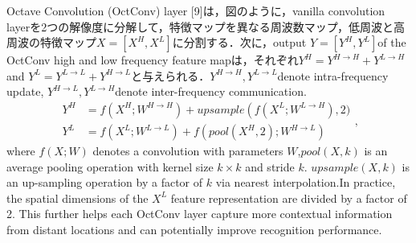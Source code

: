 \documentclass{article}
\begin{document}
Octave Convolution (OctConv) layer [9]は，図のように，vanilla convolution layerを2つの解像度に分解して，特徴マップを異なる周波数マップ，低周波と高周波の特徴マップ$X = [{X^H,X^L}]$に分割する．次に，output $Y=[{Y^H,Y^L}]$of the OctConv high and low frequency feature mapは，それぞれ$Y^H=Y^{H\rightarrow H}+Y^{L\rightarrow H}$ and $Y^L=Y^{L\rightarrow L}+Y^{H\rightarrow L}$と与えられる．$Y^{H\rightarrow H},Y^{L\rightarrow L}$denote intra-frequency update, $Y^{H\rightarrow L},Y^{L\rightarrow H}$denote inter-frequency communication.
\begin{equation}
\begin{aligned} Y^{H} &=f\left(X^{H} ; W^{H \rightarrow H}\right)+ {upsample}\left(f\left(X^{L} ; W^{L \rightarrow H}\right),2)\right.\\ Y^{L} &=f\left(X^{L} ; W^{L \rightarrow L}\right)+f\left(pool\left(X^{H}, 2\right) ; W^{H \rightarrow L}\right) \end{aligned},
\end{equation}
where $f(X; W)$ denotes a convolution with parameters $W$,$ pool(X, k)$ is an average pooling operation with kernel size $k \times k$ and stride $k$. $upsample(X, k)$ is an up-sampling operation by a factor of $k$ via nearest interpolation.In practice,  the spatial dimensions of the $X^L$ feature representation are divided by a factor of 2. This further helps each OctConv layer capture more contextual information from distant locations and can potentially improve recognition performance.
\end{document}
